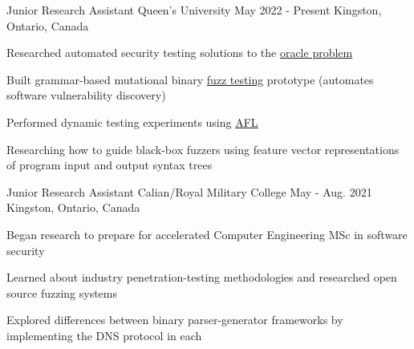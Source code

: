 

\begin{cventries}

  \cventry
    {Junior Research Assistant} %
    {Queen's University} %
    {May 2022 - Present} %
    {Kingston, Ontario, Canada} %
    {
      \begin{cvitems} %
        \item{Researched automated security testing solutions to the \href{https://en.wikipedia.org/wiki/Test_oracle}{oracle problem}}
        \item{Built grammar-based mutational binary \href{https://en.wikipedia.org/wiki/Fuzzing}{fuzz testing} prototype (automates software vulnerability discovery)} %
        \item{Performed dynamic testing experiments using \href{https://lcamtuf.coredump.cx/afl/}{AFL}}
        \item{Researching how to guide black-box fuzzers using feature vector representations of program input and output syntax trees}
      \end{cvitems}
    }

  \cventry
    {Junior Research Assistant} %
    {Calian/Royal Military College} %
    {May - Aug. 2021} %
    {Kingston, Ontario, Canada} %
    {
      \begin{cvitems} %
        \item{Began research to prepare for accelerated Computer Engineering MSc in software security}
        \item{Learned about industry penetration-testing methodologies and researched open source fuzzing systems}
        \item{Explored differences between binary parser-generator frameworks by implementing the DNS protocol in each}
      \end{cvitems}
    }


\end{cventries}
